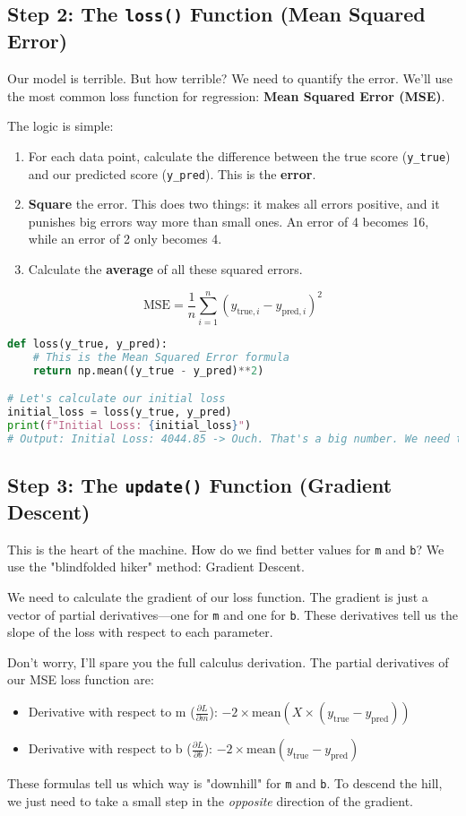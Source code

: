 \documentclass[11pt, letterpaper, openany]{book}
\begin{document}
\subsection{Step 2: The \texttt{loss()} Function (Mean Squared Error)}

Our model is terrible. But how terrible? We need to quantify the error. We'll use the most common loss function for regression: \textbf{Mean Squared Error (MSE)}.

The logic is simple:
\begin{enumerate}
    \item For each data point, calculate the difference between the true score (\texttt{y\_true}) and our predicted score (\texttt{y\_pred}). This is the \textbf{error}.
    \item \textbf{Square} the error. This does two things: it makes all errors positive, and it punishes big errors way more than small ones. An error of 4 becomes 16, while an error of 2 only becomes 4.
    \item Calculate the \textbf{average} of all these squared errors.
\end{enumerate}
\[ \text{MSE} = \frac{1}{n} \sum_{i=1}^{n} (y_{\text{true}, i} - y_{\text{pred}, i})^2 \]

\begin{lstlisting}[language=Python]
def loss(y_true, y_pred):
    # This is the Mean Squared Error formula
    return np.mean((y_true - y_pred)**2)

# Let's calculate our initial loss
initial_loss = loss(y_true, y_pred)
print(f"Initial Loss: {initial_loss}")
# Output: Initial Loss: 4044.85 -> Ouch. That's a big number. We need to lower it.
\end{lstlisting}

\subsection{Step 3: The \texttt{update()} Function (Gradient Descent)}

This is the heart of the machine. How do we find better values for \texttt{m} and \texttt{b}? We use the "blindfolded hiker" method: Gradient Descent.

We need to calculate the gradient of our loss function. The gradient is just a vector of partial derivatives—one for \texttt{m} and one for \texttt{b}. These derivatives tell us the slope of the loss with respect to each parameter.

Don't worry, I'll spare you the full calculus derivation. The partial derivatives of our MSE loss function are:
\begin{itemize}
    \item Derivative with respect to m ($\frac{\partial L}{\partial m}$): $-2 \times \text{mean}(X \times (y_{\text{true}} - y_{\text{pred}}))$
    \item Derivative with respect to b ($\frac{\partial L}{\partial b}$): $-2 \times \text{mean}(y_{\text{true}} - y_{\text{pred}})$
\end{itemize}
These formulas tell us which way is "downhill" for \texttt{m} and \texttt{b}. To descend the hill, we just need to take a small step in the \emph{opposite} direction of the gradient.
\end{document}
